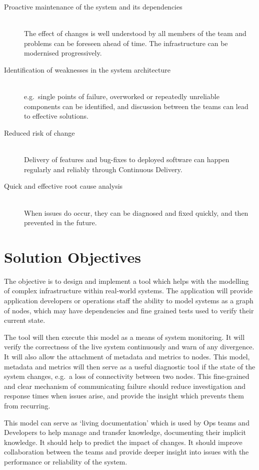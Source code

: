 \documentclass{cshonours}
\begin{document}
\begin{description}
  \item [Proactive maintenance of the system and its dependencies]\hfill \\
    The effect of changes is well understood by all members of the team and problems can be foreseen ahead of time. The infrastructure can be modernised progressively.
  \item [Identification of weaknesses in the system architecture]\hfill \\
    e.g.\ single points of failure, overworked or repeatedly unreliable components can be identified, and discussion between the teams can lead to effective solutions. 
  \item [Reduced risk of change]\hfill \\
    Delivery of features and bug-fixes to deployed software can happen regularly and reliably through Continuous Delivery. 
  \item [Quick and effective root cause analysis]\hfill \\
    When issues do occur, they can be diagnosed and fixed quickly, and then prevented in the future.
\end{description}

\section{Solution Objectives}

The objective is to design and implement a tool which helps with the modelling of complex infrastructure within real-world systems. The application will provide application developers or operations staff the ability to model systems as a graph of nodes, which may have dependencies and fine grained tests used to verify their current state.

The tool will then execute this model as a means of system monitoring. It will verify the correctness of the live system continuously and warn of any divergence. It will also allow the attachment of metadata and metrics to nodes. This model, metadata and metrics will then serve as a useful diagnostic tool if the state of the system changes, e.g.\ a loss of connectivity between two nodes. This fine-grained and clear mechanism of communicating failure should reduce investigation and response times when issues arise, and provide the insight which prevents them from recurring.

This model can serve as `living documentation' which is used by Ops teams and Developers to help manage and transfer knowledge, documenting their implicit knowledge. It should help to predict the impact of changes. It should improve collaboration between the teams and provide deeper insight into issues with the performance or reliability of the system.
\end{document}
